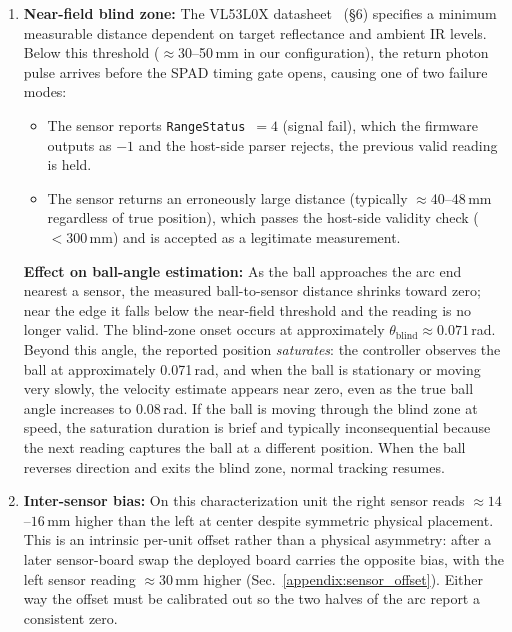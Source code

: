 \begin{enumerate}

\item \textbf{Near-field blind zone:} The VL53L0X datasheet~\cite{vl53l0x_datasheet}
(\S6) specifies a minimum measurable distance dependent on target
reflectance and ambient IR levels.
Below this threshold ($\approx$30--50\,mm in our configuration), the
return photon pulse arrives before the SPAD timing gate opens, causing
one of two failure modes:
\begin{itemize}
  \item The sensor reports \texttt{RangeStatus}~$= 4$ (signal fail),
        which the firmware outputs as $-1$ and the host-side parser
        rejects, the previous valid reading is held.
  \item The sensor returns an erroneously large distance (typically
        $\approx$40--48\,mm regardless of true position), which passes
        the host-side validity check ($<300$\,mm) and is accepted as
        a legitimate measurement.
\end{itemize}

\textbf{Effect on ball-angle estimation:}
As the ball approaches the arc end nearest a sensor, the measured
ball-to-sensor distance shrinks toward zero; near the edge it falls
below the near-field threshold and the reading is no longer valid.
The blind-zone onset occurs at approximately
$\theta_\text{blind} \approx 0.071$\,rad.
Beyond this angle, the reported position \emph{saturates}: the
controller observes the ball at approximately 0.071\,rad, and when
the ball is stationary or moving very slowly, the velocity estimate
appears near zero, even as the true ball angle increases to 0.08\,rad.
If the ball is moving through the blind zone at speed, the saturation
duration is brief and typically inconsequential because the next
reading captures the ball at a different position. When the ball
reverses direction and exits the blind zone, normal tracking resumes.

\item \textbf{Inter-sensor bias:} On this characterization unit the right
sensor reads ${\approx}14$--$16$\,mm higher than the left at center despite
symmetric physical placement. This is an intrinsic per-unit offset rather
than a physical asymmetry: after a later sensor-board swap the deployed board
carries the opposite bias, with the left sensor reading ${\approx}30$\,mm
higher (Sec.~\ref{appendix:sensor_offset}). Either way the offset must be
calibrated out so the two halves of the arc report a consistent zero.

\end{enumerate}

